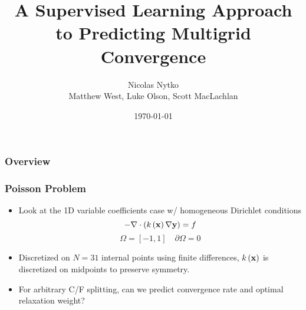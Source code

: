 \documentclass{beamer}
\title{A Supervised Learning Approach to Predicting Multigrid Convergence}
\author[me]{Nicolas Nytko\\[3mm]Matthew West, Luke Olson, Scott MacLachlan}
\date{\today}
\renewcommand{\vec}[1]{ {\bf #1} }
\begin{document}
\frame{\titlepage}

\begin{frame}
  \frametitle{Overview}
\end{frame}

\begin{frame}
  \frametitle{Poisson Problem}
  \begin{itemize}
  \item Look at the 1D variable coefficients case w/ homogeneous Dirichlet conditions
    \[ -\nabla \cdot \left(k\left(\vec{x}\right) \nabla \vec{y} \right) = f \]
    \[ \Omega = \left[-1, 1\right] \quad \partial\Omega = 0 \]
  \item Discretized on $N=31$ internal points using finite differences, $k\left(\vec{x}\right)$ is discretized on midpoints to preserve symmetry.
  \item For arbitrary C/F splitting, can we predict convergence rate and optimal relaxation weight?
  \end{itemize}
\end{frame}
\end{document}
